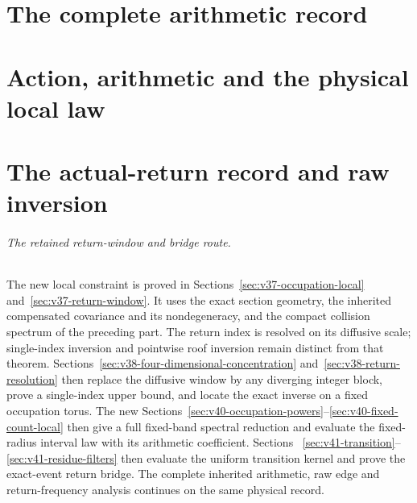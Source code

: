 \documentclass[11pt,reqno]{amsart}
\numberwithin{equation}{section}
\theoremstyle{definition}\newtheorem{definition}[theorem]{Definition}
\theoremstyle{remark}\newtheorem{remark}[theorem]{Remark}
\begin{document}
\part{The complete arithmetic record}


\part{Action, arithmetic and the physical local law}









\part{The actual-return record and raw inversion}
\paragraph{The retained return-window and bridge route.}
The new local constraint is proved in
Sections~\ref{sec:v37-occupation-local} and~\ref{sec:v37-return-window}.
It uses the exact section geometry, the inherited compensated
covariance and its nondegeneracy, and the compact collision spectrum
of the preceding part. The return index is resolved on its diffusive scale;
single-index inversion and pointwise roof inversion remain distinct
from that theorem. Sections~\ref{sec:v38-four-dimensional-concentration}
and~\ref{sec:v38-return-resolution} then replace the diffusive window
by any diverging integer block, prove a single-index upper bound, and
locate the exact inverse on a fixed occupation torus. The new
Sections~\ref{sec:v40-occupation-powers}--\ref{sec:v40-fixed-count-local}
then give a full fixed-band spectral reduction and evaluate the
fixed-radius interval law with its arithmetic coefficient. Sections~
\ref{sec:v41-transition}--\ref{sec:v41-residue-filters} then evaluate
the uniform transition kernel and prove the exact-event return bridge. The
complete inherited arithmetic, raw edge and return-frequency analysis
continues on the same physical record.

















\end{document}
